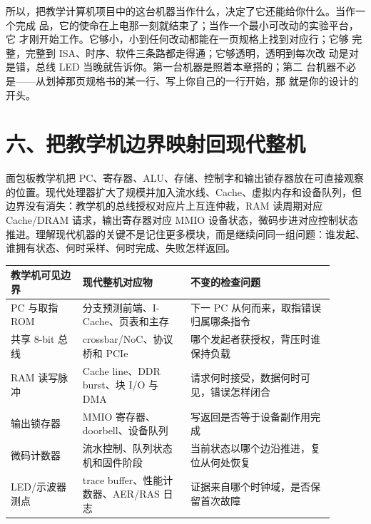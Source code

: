 所以，把教学计算机项目中的这台机器当作什么，决定了它还能给你什么。当作一个完成
品，它的使命在上电那一刻就结束了；当作一个最小可改动的实验平台，它
才刚开始工作。它够小，小到任何改动都能在一页规格上找到对应行；它够
完整，完整到 ISA、时序、软件三条路都走得通；它够透明，透明到每次改
动是对是错，总线 LED 当晚就告诉你。第一台机器是照着本章搭的；第二
台机器不必是——从划掉那页规格书的某一行、写上你自己的一行开始，那
就是你的设计的开头。




























\section{六、把教学机边界映射回现代整机}

面包板教学机把 PC、寄存器、ALU、存储、控制字和输出锁存器放在可直接观察的位置。现代处理器扩大了规模并加入流水线、Cache、虚拟内存和设备队列，但边界没有消失：教学机的总线授权对应片上互连仲裁，RAM 读周期对应 Cache/DRAM 请求，输出寄存器对应 MMIO 设备状态，微码步进对应控制状态推进。理解现代机器的关键不是记住更多模块，而是继续问同一组问题：谁发起、谁拥有状态、何时采样、何时完成、失败怎样返回。

\begin{longtable}{L{0.20\linewidth}L{0.30\linewidth}L{0.40\linewidth}}
\toprule
教学机可见边界 & 现代整机对应物 & 不变的检查问题 \\
\midrule
PC 与取指 ROM & 分支预测前端、I-Cache、页表和主存 & 下一 PC 从何而来，取指错误归属哪条指令 \\\tablerowrule
共享 8-bit 总线 & crossbar/NoC、协议桥和 PCIe & 哪个发起者获授权，背压时谁保持负载 \\\tablerowrule
RAM 读写脉冲 & Cache line、DDR burst、块 I/O 与 DMA & 请求何时接受，数据何时可见，错误怎样闭合 \\\tablerowrule
输出锁存器 & MMIO 寄存器、doorbell、设备队列 & 写返回是否等于设备副作用完成 \\\tablerowrule
微码计数器 & 流水控制、队列状态机和固件阶段 & 当前状态以哪个边沿推进，复位从何处恢复 \\\tablerowrule
LED/示波器测点 & trace buffer、性能计数器、AER/RAS 日志 & 证据来自哪个时钟域，是否保留首次故障 \\
\bottomrule
\end{longtable}

